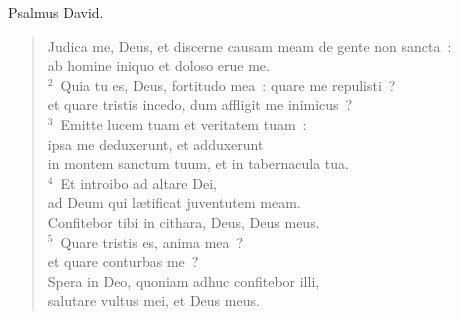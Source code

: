 \lettrine[lines=3,image=true,loversize=0.05,lraise=-0.03]{P}{}salmus David. \begin{flushleft}\begin{verse}\vspace{6pt}Judica me, Deus, et discerne causam meam de gente non sancta~:\\ ab homine iniquo et doloso erue me.\\
${}^{2}$~Quia tu es, Deus, fortitudo mea~: quare me repulisti~?\\ et quare tristis incedo, dum affligit me inimicus~?\\
${}^{3}$~Emitte lucem tuam et veritatem tuam~:\\ ipsa me deduxerunt, et adduxerunt\\ in montem sanctum tuum, et in tabernacula tua.\\
${}^{4}$~Et introibo ad altare Dei,\\ ad Deum qui l\ae tificat juventutem meam.\\ Confitebor tibi in cithara, Deus, Deus meus.\\
${}^{5}$~Quare tristis es, anima mea~?\\ et quare conturbas me~?\\ Spera in Deo, quoniam adhuc confitebor illi,\\ salutare vultus mei, et Deus meus.\end{verse}\end{flushleft}



